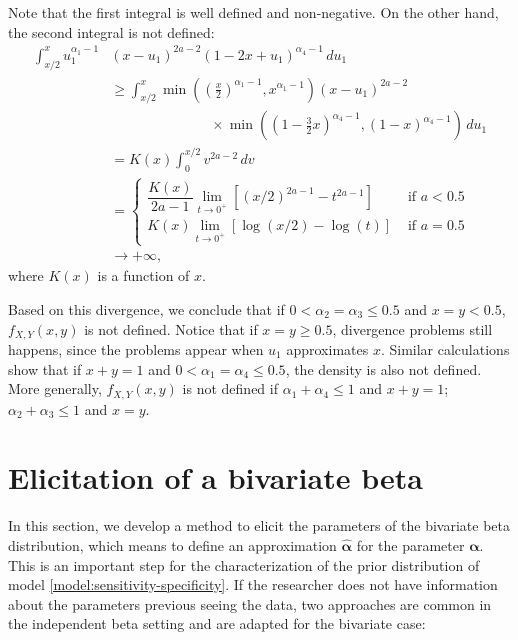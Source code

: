 Note that the first integral is well defined and non-negative. On the other hand, the second integral is not defined: 
\begin{equation*}
  \begin{split}
    \int_{x/2}^{x} u_1^{\alpha_1-1}&(x-u_1)^{2a-2}(1-2x+u_1)^{\alpha_4-1} \, du_1 \\
    &\ge \int_{x/2}^x \min\left(\left(\frac{x}{2}\right)^{\alpha_1-1}, x^{\alpha_1-1}\right)(x-u_1)^{2a-2} \\ 
    &\hspace{3cm} \times \min\left(\left(1-\frac{3}{2}x\right)^{\alpha_4-1}, (1-x)^{\alpha_4-1}\right) \, du_1 \\
    &= K(x) \int_{0}^{x/2} v^{2a-2} \, dv \\ 
    &= \begin{cases}
      \dfrac{K(x)}{2a-1} \lim_{t \to 0^+} \left[(x/2)^{2a-1} - t^{2a-1}\right] &\text{ if } a < 0.5 \\ 
      K(x) \lim_{t \to 0^+} \left[\log(x/2) - \log(t)\right] &\text{ if } a = 0.5
    \end{cases} \\
    &\to +\infty, 
  \end{split}
\end{equation*}
where $K(x)$ is a function of $x$. 

Based on this divergence, we conclude that if $0 < \alpha_2 = \alpha_3 \le 0.5$
and $x = y < 0.5$, $f_{X,Y}(x,y)$ is not defined. Notice that if $x = y \ge
0.5$, divergence problems still happens, since the problems appear when $u_1$ approximates $x$. Similar calculations show that if $x + y = 1$ and $0 < \alpha_1 = \alpha_4 \le 0.5$, the density is also
not defined. More generally, $f_{X,Y}(x,y)$ is not defined if $\alpha_1 +
\alpha_4 \le 1$ and $x + y = 1$; $\alpha_2 + \alpha_3 \le 1$ and $x = y$.

\section{Elicitation of a bivariate beta}
\label{sec:elicitation-bivariate-beta}

In this section, we develop a method to elicit the parameters of the bivariate
beta distribution, which means to define an approximation
$\hat{\boldsymbol{\alpha}}$ for the parameter $\boldsymbol{\alpha}$. 
This is an important step for the characterization of the prior distribution of model
\eqref{model:sensitivity-specificity}. If the researcher does not have
information about the parameters previous seeing the data, two approaches
are common in the independent beta setting and are adapted for the bivariate 
case:

